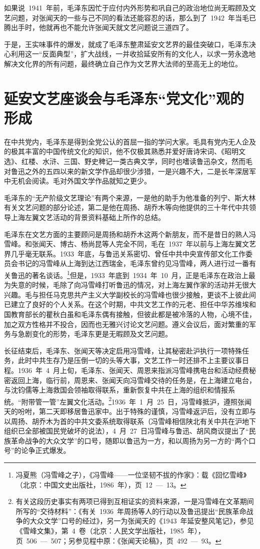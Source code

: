 如果说~1941~年前，毛泽东因忙于应付内外形势和巩自己的政治地位尚无暇顾及文艺问题，对张闻天的一些与己不同的看法还能容忍的话，那么到了~1942~年当毛已腾出手时，他就再也不能允许张闻天就文艺问题说三道四了。

于是，王实味事件的爆发，就成了毛泽东整肃延安文艺界的最佳突破口，毛泽东决心利用这一“反面典型”，扩大战线，一并收拾延安所有的文化人，以求一劳永逸地解决文化界的所有问题，最终确立自己作为文艺界大法师的至高无上的地位。

\section{延安文艺座谈会与毛泽东“党文化”观的形成}

在中共党内，毛泽东是得到全党公认的首屈一指的学问大家。毛具有党内无人企及的极其丰富的中国传统文化的知识，他不仅极其熟悉并爱好唐诗宋词、《昭明文选》、红楼、水浒、三国、野史稗记一类古典文学，同时也嗜读鲁迅杂文，然而毛对鲁迅之外的五四以来的新文学作品却很少涉猎，一是兴趣不大，二是长年深居军中无机会阅读。毛对外国文学作品就知之更少。

毛泽东的“无产阶级文艺理论”有两个来源，一是他的助手为他准备的列宁、斯大林有关文艺问题的部分论述，第二是他在周扬、胡乔木等向他提供的三十年代中共领导上海左翼文艺活动的背景资料基础上所作的总结。

毛泽东在文艺方面的主要顾问是周扬和胡乔木这两个新朋友，而不是昔日的熟人冯雪峰。和张闻天、博古、杨尚昆等人完全不同，毛在~1937~年以前与上海左翼文艺界几乎毫无联系。1933~年底，与鲁迅关系密切、曾任中共中央宣传部文化工作委员会书记的冯雪峰从上海到达江西瑞金，毛泽东曾约见冯雪峰，两人进行过一番有关鲁迅的著名谈话。\footnote{冯夏熊（冯雪峰之子），《冯雪峰——一位坚韧不拔的作家》：载《回忆雪峰》（北京：中国文史出版社，1986~年），页~12~—~13。}但是，1933~年底到~1934~年~10~月，正是毛泽东在政治上最为失意的时候，毛除了向冯雪峰打听鲁迅的情况，对上海左翼作家的活动并无很大兴趣。毛与担任马克思共产主义大学副校长的冯雪峰也很少接触，更谈不上彼此间已建立了良好的个人关系。在这个时期，中共文艺工作的元老、担任中华苏维埃和国教育部长的瞿秋白虽和毛泽东偶有接触，但彼此都是被冷落的人物，心境不佳，加之双方性格并不投合，因而也无雅兴讨论文艺问题。遵义会议后，面对繁重的军务与急剧变化的形势，毛泽东更是无暇顾及文艺问题。

长征结束后，毛泽东、张闻天等决定启用冯雪峰，让其秘密赴沪执行一项特殊任务，此时中共生存乃是压倒一切的头等大事，文艺工作一时还排不上主要议事日程。1936~年~4~月上旬，毛泽东、张闻天、周恩来指派冯雪峰携电台和活动经费秘密返回上海，临行前，周恩来、张闻天向冯雪峰交待的任务是，在上海建立电台，与沈钧儒等上海救国会领袖取得联系，重新恢复中共在上海的组织和情报系统。“附带管一管”左翼文化活动。\footnote{有关这段历史事实有两项已得到互相证实的资料来源，一是冯雪峰在文革期间所写的“交待材料”：《有关~1936~年周扬等人的行动以及鲁迅提出“民族革命战争的大众文学”口号的经过》，另一为张闻天的《1943~年延安整风笔记》，参见《雪峰文集》，第~4~卷（北京：人民文学出版社，1985~年），页~506~—~507；另参见程中原：《张闻天论稿》，页~492~—~93。}1936~年~1~月~25~日，冯雪峰抵沪，遵照张闻天的吩咐，第二天即移居鲁迅家中。出于特殊的谨慎，冯雪峰返沪后，没有立即与以周扬、胡乔木为首的中共文委系统取得联系（冯雪峰相信陕北有关中共在沪地下组织已全部被国民党破坏的说法），4~月~27~日冯雪峰与鲁迅、胡风商议提出了“民族革命战争的大众文学”的口号，随即以鲁迅为一方，和以周扬为另一方的“两个口号”的论争正式爆发。

